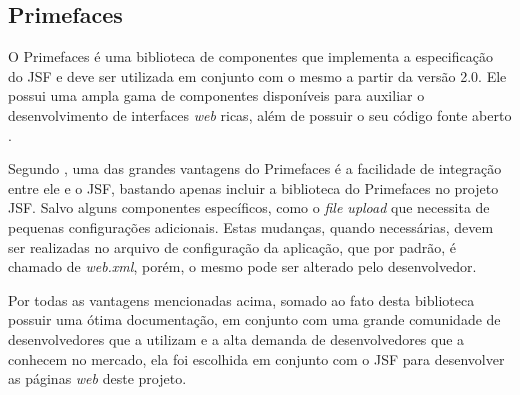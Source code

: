 \subsection{Primefaces}

\par O Primefaces é uma biblioteca de componentes que implementa a especificação do JSF e deve ser utilizada em conjunto com o mesmo a partir da versão 2.0. Ele possui uma ampla gama de componentes disponíveis para auxiliar o desenvolvimento de interfaces \textit{web} ricas, além de possuir o seu código fonte aberto \cite{ross_borsoi_uso_primefaces}.

\par Segundo , uma das grandes vantagens do Primefaces é a facilidade de integração entre ele e o JSF, bastando apenas incluir a biblioteca do Primefaces no projeto JSF. Salvo alguns componentes específicos, como o \textit{file upload} que necessita de pequenas configurações adicionais. Estas mudanças, quando necessárias, devem ser realizadas no arquivo de configuração da aplicação, que por padrão, é chamado de \textit{web.xml}, porém, o mesmo pode ser alterado pelo desenvolvedor.

\par Por todas as vantagens mencionadas acima, somado ao fato desta biblioteca possuir uma ótima documentação, em conjunto com uma grande comunidade de desenvolvedores que a utilizam e a alta demanda de desenvolvedores que a conhecem no mercado, ela foi escolhida em conjunto com o JSF para desenvolver as páginas \textit{web} deste projeto.
